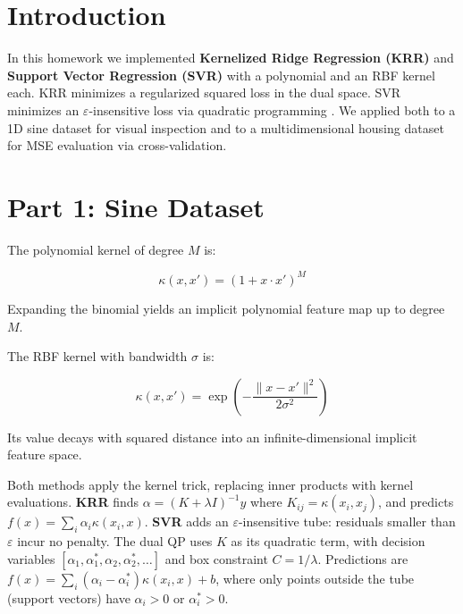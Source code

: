 \documentclass[fleqn,moreauthors,10pt]{ds_report}
\affiliation{\textit{ta5946@fri.uni-lj.si}}
\begin{document}
\flushbottom
\maketitle
\thispagestyle{empty}

\section*{Introduction}

In this homework we implemented \textbf{Kernelized Ridge Regression (KRR)} and \textbf{Support Vector Regression (SVR)} with a polynomial and an RBF kernel each. KRR minimizes a regularized squared loss in the dual space. SVR minimizes an $\varepsilon$-insensitive loss via quadratic programming \cite{smola2004tutorial}. We applied both to a 1D sine dataset for visual inspection and to a multidimensional housing dataset for MSE evaluation via cross-validation.

\section*{Part 1: Sine Dataset}

The polynomial kernel of degree $M$ is:

\begin{equation}
    \kappa(x, x') = (1 + x \cdot x')^M
\end{equation}

Expanding the binomial yields an implicit polynomial feature map up to degree $M$.

The RBF kernel with bandwidth $\sigma$ is:

\begin{equation}
    \kappa(x, x') = \exp\!\left(-\frac{\|x - x'\|^2}{2\sigma^2}\right)
\end{equation}

Its value decays with squared distance into an infinite-dimensional implicit feature space.

Both methods apply the kernel trick, replacing inner products with kernel evaluations. \textbf{KRR} finds $\alpha = (K + \lambda I)^{-1} y$ where $K_{ij} = \kappa(x_i, x_j)$, and predicts $f(x) = \sum_i \alpha_i \kappa(x_i, x)$. \textbf{SVR} adds an $\varepsilon$-insensitive tube: residuals smaller than $\varepsilon$ incur no penalty. The dual QP uses $K$ as its quadratic term, with decision variables $[\alpha_1, \alpha_1^*, \alpha_2, \alpha_2^*, \ldots]$ and box constraint $C = 1/\lambda$. Predictions are $f(x) = \sum_i (\alpha_i - \alpha_i^*)\kappa(x_i, x) + b$, where only points outside the tube (support vectors) have $\alpha_i > 0$ or $\alpha_i^* > 0$.
\end{document}
